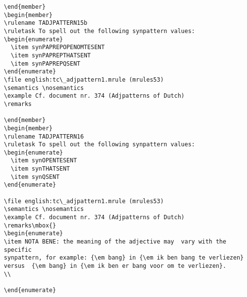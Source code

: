 \begin{verbatim}
\end{member}
\begin{member}
\rulename TADJPATTERN15b
\ruletask To spell out the following synpattern values:
\begin{enumerate}
  \item synPAPREPOPENOMTESENT
  \item synPAPREPTHATSENT
  \item synPAPREPQSENT
\end{enumerate}
\file english:tc\_adjpattern1.mrule (mrules53)
\semantics \nosemantics
\example Cf. document nr. 374 (Adjpatterns of Dutch)
\remarks

\end{member}
\begin{member}
\rulename TADJPATTERN16
\ruletask To spell out the following synpattern values:
\begin{enumerate}
  \item synOPENTESENT
  \item synTHATSENT
  \item synQSENT
\end{enumerate}

\file english:tc\_adjpattern1.mrule (mrules53)
\semantics \nosemantics
\example Cf. document nr. 374 (Adjpatterns of Dutch)
\remarks\mbox{}
\begin{enumerate}
\item NOTA BENE: the meaning of the adjective may  vary with the specific 
synpattern, for example: {\em bang} in {\em ik ben bang te verliezen}
versus  {\em bang} in {\em ik ben er bang voor om te verliezen}.
\\

\end{enumerate}


\end{verbatim}

